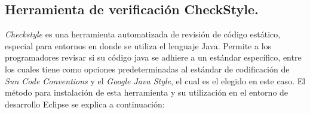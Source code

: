 \documentclass[a4paper]{article}
\begin{document}
{\color{Blue}
\subsection{Herramienta de verificación CheckStyle.}
\color{black}

\textit{Checkstyle} es una herramienta automatizada de revisión de código estático, especial para entornos en donde se utiliza el lenguaje Java. Permite a los programadores revisar si su código java se adhiere a un estándar específico, entre los cuales tiene como opciones predeterminadas al estándar de codificación de \textit{Sun Code Conventions} y el \textit{Google Java Style}, el cual es el elegido en este caso. El método para instalación de esta herramienta y su utilización en el entorno de desarrollo Eclipse se explica a continuación:
    
}
\end{document}
